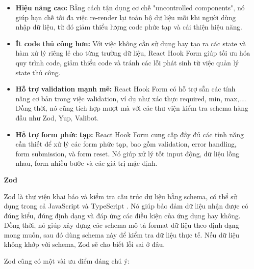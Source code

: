 \begin{itemize}
    \item \textbf{Hiệu năng cao:} Bằng cách tận dụng cơ chế "uncontrolled components", nó giúp hạn chế tối đa việc re-render lại toàn bộ dữ liệu mỗi khi người dùng nhập dữ liệu, từ đó giảm thiểu lượng code phức tạp và cải thiện hiệu năng.

    \item \textbf{Ít code thủ công hơn:} Với việc không cần sử dụng hay tạo ra các state và hàm xử lý riêng lẻ cho từng trường dữ liệu, React Hook Form giúp tối ưu hóa quy trình code, giảm thiểu code và tránh các lỗi phát sinh từ việc quản lý state thủ công. 

    \item \textbf{Hỗ trợ validation mạnh mẽ:} React Hook Form có hỗ trợ sẵn các tính năng cơ bản trong việc validation, ví dụ như xác thực required, min, max,.... Đồng thời, nó cũng tích hợp mượt mà với các thư viện kiểm tra schema hàng đầu như Zod, Yup, Valibot.
    
    \item \textbf{Hỗ trợ form phức tạp:} React Hook Form cung cấp đầy đủ các tính năng cần thiết để xử lý các form phức tạp, bao gồm validation, error handling, form submission, và form reset. Nó giúp xử lý tốt input động, dữ liệu lồng nhau, form nhiều bước và các giá trị mặc định.
\end{itemize}

\medskip
\noindent\textbf{Zod}
\medskip

Zod là thư viện khai báo và kiểm tra cấu trúc dữ liệu bằng schema, có thể sử dụng trong cả JavaScript và TypeScript \cite{zoddocs}. Nó giúp bảo đảm dữ liệu nhận được có đúng kiểu, đúng định dạng và đáp ứng các điều kiện của ứng dụng hay không. Đồng thời, nó giúp xây dựng các schema mô tả format dữ liệu theo định dạng mong muốn, sau đó dùng schema này để kiểm tra dữ liệu thực tế. Nếu dữ liệu không khớp với schema, Zod sẽ cho biết lỗi sai ở đâu.

Zod cũng có một vài ưu điểm đáng chú ý:

